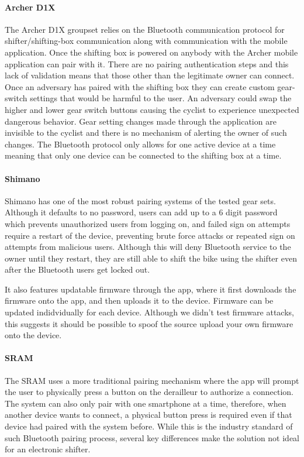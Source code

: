 \documentclass[letterpaper,twocolumn,10pt]{article}
\begin{document}
\paragraph{Archer D1X}
The Archer D1X groupset relies on the Bluetooth communication protocol for shifter/shifting-box communication along with communication with the mobile application. Once the shifting box is powered on anybody with the Archer mobile application can pair with it. There are no pairing authentication steps and this lack of validation means that those other than the legitimate owner can connect. Once an adversary has paired with the shifting box they can create custom gear-switch settings that would be harmful to the user. An adversary could swap the higher and lower gear switch buttons causing the cyclist to experience unexpected dangerous behavior. Gear setting changes made through the application are invisible to the cyclist and there is no mechanism of alerting the owner of such changes. The Bluetooth protocol only allows for one active device at a time meaning that only one device can be connected to the shifting box at a time.

\paragraph{Shimano}
Shimano has one of the most robust pairing systems of the tested gear sets. Although it defaults to no password, users can add up to a 6 digit password which prevents unauthorized users from logging on, and failed sign on attempts require a restart of the device, preventing brute force attacks or repeated sign on attempts from malicious users. Although this will deny Bluetooth service to the owner until they restart, they are still able to shift the bike using the shifter even after the Bluetooth users get locked out.

It also features updatable firmware through the app, where it first downloads the firmware onto the app, and then uploads it to the device. Firmware can be updated indidvidually for each device. Although we didn't test firmware attacks, this suggests it should be possible to spoof the source upload your own firmware onto the device.

\paragraph{SRAM}
The SRAM uses a more traditional pairing mechanism where the app will prompt the user to physically press a button on the derailleur to authorize a connection. The system can also only pair with one smartphone at a time, therefore, when another device wants to connect, a physical button press is required even if that device had paired with the system before. While this is the industry standard of such Bluetooth pairing process, several key differences make the solution not ideal for an electronic shifter.
\end{document}
